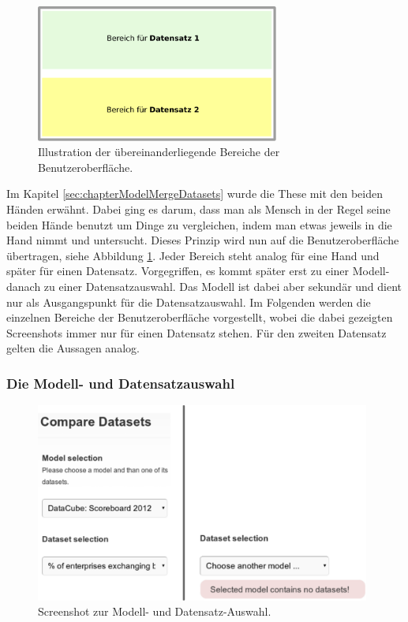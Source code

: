 \documentclass[11pt]{article}
\begin{document}
%
%
\begin{figure}[h!]
    \centering
    \includegraphics[width=8cm]{UserInterfaceMergeDatasets/UserInterfaceAreas.pdf}
    \caption{Illustration der übereinanderliegende Bereiche der Benutzeroberfläche.}
    \label{fig:UserInterfaceMergeDatasets_UserInterfaceAreas}
\end{figure}

\newpage
\noindent
Im Kapitel \ref{sec:chapterModelMergeDatasets} wurde die These mit den beiden Händen erwähnt. Dabei ging es darum, dass man als Mensch in der Regel seine beiden Hände benutzt um Dinge zu vergleichen, indem man etwas jeweils in die Hand nimmt und untersucht. Dieses Prinzip wird nun auf die Benutzeroberfläche übertragen, siehe Abbildung \ref{fig:UserInterfaceMergeDatasets_UserInterfaceAreas}. Jeder Bereich steht analog für eine Hand und später für einen Datensatz. Vorgegriffen, es kommt später erst zu einer Modell- danach zu einer Datensatzauswahl. Das Modell ist dabei aber sekundär und dient nur als Ausgangspunkt für die Datensatzauswahl. Im Folgenden werden die einzelnen Bereiche der Benutzeroberfläche vorgestellt, wobei die dabei gezeigten Screenshots immer nur für einen Datensatz stehen. Für den zweiten Datensatz gelten die Aussagen analog. 

%
%
\subsubsection{Die Modell- und Datensatzauswahl}

%
%
\begin{figure}[h!]
    \centering
    \includegraphics[width=11cm]{UserInterfaceMergeDatasets/ScreenWhileModelDSSelection.pdf}
    \caption{Screenshot zur Modell- und Datensatz-Auswahl.}
    \label{fig:UserInterfaceMergeDatasets_ScreenWhileModelDSSelection}
\end{figure}
\end{document}
